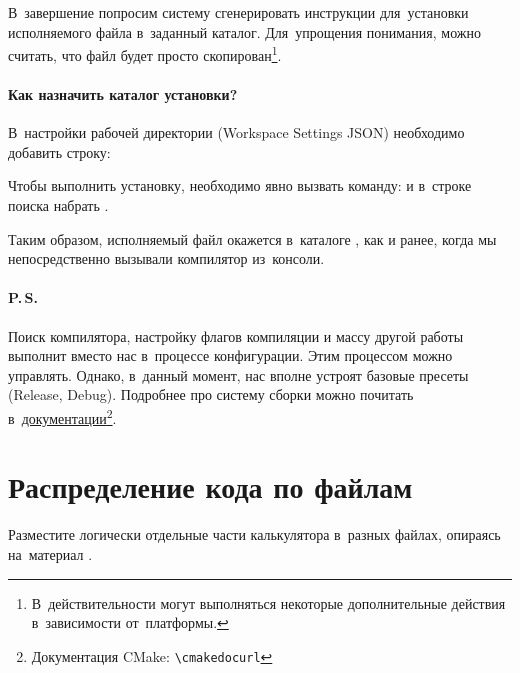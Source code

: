 
В~завершение попросим систему сгенерировать инструкции для~установки исполняемого файла в~заданный каталог. Для~упрощения понимания, можно считать, что файл будет просто скопирован\footnote{В~действительности могут выполняться некоторые дополнительные действия в~зависимости от~платформы.}.




\paragraph{Как назначить каталог установки?}
В~настройки рабочей директории (\textenglish{Workspace Settings JSON}) необходимо добавить строку:


Чтобы выполнить установку, необходимо явно вызвать команду:  и в~строке поиска набрать .

Таким образом, исполняемый файл окажется в~каталоге , как и ранее, когда мы непосредственно вызывали компилятор из~консоли.



\paragraph{P.\,S.}
Поиск компилятора, настройку флагов компиляции и массу другой работы  выполнит вместо нас в~процессе конфигурации. Этим процессом можно управлять. Однако, в~данный момент, нас вполне устроят базовые пресеты (\textenglish{Release, Debug}). Подробнее про систему сборки  можно почитать в~\href{\cmakedocurl}{документации}\footnote{Документация CMake: \nolinkurl{\cmakedocurl}}.



\section{Распределение кода по файлам}
Разместите логически отдельные части калькулятора в~разных файлах, опираясь на~материал .

